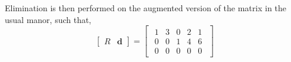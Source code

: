         Elimination is then performed on the augmented version of the matrix in the usual manor, such that,
        \begin{equation}
            \begin{bmatrix}
                R & \boldsymbol{d}
            \end{bmatrix}
            =
            \begin{bmatrix}
                \begin{array}{cccc|c}
                    1 & 3 & 0 & 2 & 1 \\
                    0 & 0 & 1 & 4 & 6 \\
                    0 & 0 & 0 & 0 & 0
                \end{array}
            \end{bmatrix}
        \end{equation}
          
